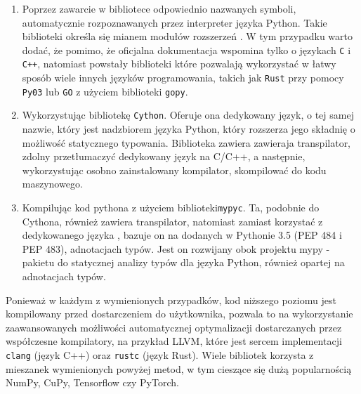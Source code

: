 \documentclass[10pt, a4paper]{article}
\newcommand{\code}[1]{\texttt{#1}}
\begin{document}
\begin{sloppypar}
\begin{enumerate}
      \item Poprzez zawarcie w bibliotece odpowiednio nazwanych symboli, automatycznie
        rozpoznawanych przez interpreter języka Python. Takie biblioteki określa się mianem
        modułów rozszerzeń \cite{Extending_Python_With_C_Cpp}. W tym przypadku warto
        dodać, że pomimo, że oficjalna dokumentacja wspomina tylko o językach \code{C} i
        \code{C++}, natomiast powstały biblioteki które pozwalają wykorzystać w łatwy sposób
        wiele innych języków programowania, takich jak \code{Rust} przy pomocy \code{Py03}\cite{PyO3}
        lub \code{GO} z użyciem biblioteki \code{gopy}\cite{gopy}.

      \item Wykorzystując bibliotekę \code{Cython}\cite{Cython_Org}\cite{Cython_The_Best_Of_Both}.
        Oferuje ona dedykowany język, o tej samej nazwie, który jest nadzbiorem języka Python,
        który rozszerza jego składnię o możliwość statycznego typowania. Biblioteka zawiera
        zawieraja transpilator, zdolny przetłumaczyć dedykowany język na C/C++, a następnie,
        wykorzystując osobno zainstalowany kompilator, skompilować do kodu maszynowego.


      \item Kompilując kod pythona z użyciem biblioteki\code{mypyc}\cite{mypyc}. Ta,
        podobnie do Cythona, również zawiera transpilator, natomiast zamiast korzystać z
        dedykowanego języka , bazuje on na dodanych w Pythonie 3.5\cite{Python_3_5} (PEP
        484\cite{PEP_484} i PEP 483\cite{PEP_483}), adnotacjach typów. Jest on rozwijany
        obok projektu mypy - pakietu do statycznej analizy typów dla języka Python,
        również opartej na adnotacjach typów\cite{mypy}.
    \end{enumerate}

    Ponieważ w każdym z wymienionych przypadków, kod niższego poziomu jest kompilowany
    przed dostarczeniem do użytkownika, pozwala to na wykorzystanie zaawansowanych możliwości
    automatycznej optymalizacji dostarczanych przez współczesne kompilatory, na przykład
    LLVM, które jest sercem implementacji \code{clang} (język C++) oraz \code{rustc} (język
    Rust). Wiele bibliotek korzysta z mieszanek wymienionych powyżej metod, w tym cieszące
    się dużą popularnością NumPy, CuPy, Tensorflow czy PyTorch.


\end{sloppypar}
\end{document}
